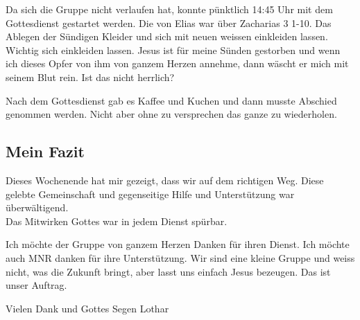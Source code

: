\documentclass[fontsize=14pt]{mybib}
\begin{document}
    Da sich die Gruppe nicht verlaufen hat, konnte pünktlich 14:45 Uhr mit dem Gottesdienst gestartet werden. Die von Elias war über Zacharias 3 1-10. Das Ablegen der Sündigen Kleider und sich mit neuen weissen einkleiden lassen. Wichtig sich einkleiden lassen. Jesus ist für meine Sünden gestorben und wenn ich dieses Opfer von ihm von ganzem Herzen annehme, dann wäscht er mich mit seinem Blut rein. Ist das nicht herrlich?

    Nach dem Gottesdienst gab es Kaffee und Kuchen und dann musste Abschied genommen werden. Nicht aber ohne zu versprechen das ganze zu wiederholen.

    \subsection*{Mein Fazit}
    Dieses Wochenende hat mir gezeigt, dass wir auf dem richtigen Weg. Diese gelebte Gemeinschaft und gegenseitige Hilfe und Unterstützung war überwältigend.\\
    Das Mitwirken Gottes war in jedem Dienst spürbar.

    Ich möchte der Gruppe von ganzem Herzen Danken für ihren Dienst. Ich möchte auch MNR danken für ihre Unterstützung. Wir sind eine kleine Gruppe und weiss nicht, was die Zukunft bringt, aber lasst uns einfach Jesus bezeugen. Das ist unser Auftrag.

    Vielen Dank und Gottes Segen Lothar
\end{document}
